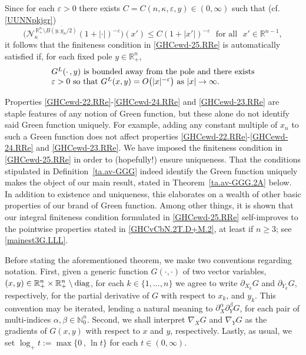 \documentclass[11pt,reqno]{amsart}
\numberwithin{equation}{section}
\theoremstyle{remark}
\begin{document}
Since for each $\varepsilon>0$ there exists $C=C(n,\kappa,\varepsilon,y)\in(0,\infty)$ such that (cf. \eqref{UUNNpkjgr}) 
%
\begin{equation}\label{GHCvCbN.2T.D+M}
\Big({\mathcal{N}}^{\,{\mathbb{R}}^n_{+}\setminus\overline{B(y,y_n/2)}}_{\kappa}(1+|\cdot|)^{-\varepsilon}\Big)(x')
\leq C(1+|x'|)^{-\varepsilon}\,\,\text{ for all }\,\,x'\in{\mathbb{R}}^{n-1},
\end{equation}
%
it follows that the finiteness condition in \eqref{GHCewd-25.RRe} is automatically satisfied if, 
for each fixed pole $y\in{\mathbb{R}}^n_{+}$, 
%
\begin{equation}\label{GHCvCbN.2T.D+M.2}
\parbox{8.70cm}{$G^L(\cdot\,,y)$ is bounded away from the pole and there exists $\varepsilon>0$ so that
$G^L(x,y)=O\big(|x|^{-\varepsilon}\big)$ as $|x|\to\infty$.}
\end{equation}

Properties \eqref{GHCewd-22.RRe}-\eqref{GHCewd-24.RRe} and \eqref{GHCewd-23.RRe} are staple features of any notion 
of Green function, but these alone do not identify said Green function uniquely. For example, adding any 
constant multiple of $x_n$ to such a Green function does not affect properties \eqref{GHCewd-22.RRe}-\eqref{GHCewd-24.RRe} 
and \eqref{GHCewd-23.RRe}. We have imposed the finiteness condition in \eqref{GHCewd-25.RRe} in order to (hopefully!) ensure uniqueness.
That the conditions stipulated in Definition~\ref{ta.av-GGG} indeed identify the Green function uniquely
makes the object of our main result, stated in Theorem~\ref{ta.av-GGG.2A} below. In addition to existence 
and uniqueness, this elaborates on a wealth of other basic properties of our brand of Green function. 
Among other things, it is shown that our integral finiteness condition formulated in \eqref{GHCewd-25.RRe} 
self-improves to the pointwise properties stated in \eqref{GHCvCbN.2T.D+M.2}, at least if $n\geq 3$; see \eqref{mainest3G.LLL}. 

Before stating the aforementioned theorem, we make two conventions regarding notation. First, given a generic function $G(\cdot,\cdot)$ 
of two vector variables, $(x,y)\in{\mathbb{R}}^n_{+}\times{\mathbb{R}}^n_{+}\setminus{\rm diag}$, for each $k\in\{1,\dots,n\}$ 
we agree to write $\partial_{X_k} G$ and $\partial_{Y_k} G$, respectively, for the partial derivative 
of $G$ with respect to $x_k$, and $y_k$. This convention may be iterated, lending a natural meaning to 
$\partial^\alpha_X\partial^\beta_Y G$, for each pair of multi-indices $\alpha,\beta\in{\mathbb{N}}_0^n$. 
Second, we shall interpret $\nabla_X G$ and $\nabla_Y G$ as the gradients of $G(x,y)$ with respect to 
$x$ and $y$, respectively. Lastly, as usual, we set $\log_{+}t:=\max\big\{0\,,\,\ln t\big\}$ for each $t\in(0,\infty)$.
\end{document}
